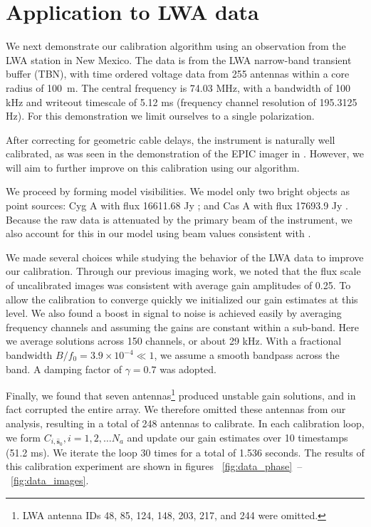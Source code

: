 \documentclass[a4paper,fleqn,usenatbib]{mnras}
\begin{document}
\section{Application to LWA data}\label{sec:data}
We next demonstrate our calibration algorithm using an observation from the LWA station in 
New Mexico. The data is from the LWA narrow-band transient buffer (TBN), with time ordered 
voltage data from 255 antennas within a core radius of 100~m. The central frequency is 74.03 
MHz, with a bandwidth of 100 kHz and writeout timescale of 5.12 ms (frequency channel 
resolution of 195.3125 Hz). For this demonstration we limit ourselves to a single polarization.

After correcting for geometric cable delays, the instrument is naturally well calibrated, as was 
seen in the demonstration of the EPIC imager in \citealt{thy15c}. However, we will aim to 
further improve on this calibration using our algorithm.

We proceed by forming model visibilities. We model only two bright objects as point sources: 
Cyg A with flux 16611.68 Jy \citep{coh07}; and Cas A with flux 17693.9 Jy \citep{kas07}. 
Because the raw data is attenuated by the primary beam of the instrument, we also account for 
this in our model using beam values consistent with \cite{hic12}.

We made several choices while studying the behavior of the LWA data to improve our 
calibration. Through our previous imaging work, we noted that the flux scale of uncalibrated 
images was consistent with average gain amplitudes of 0.25. To allow the calibration to 
converge quickly we initialized our gain estimates at this level. We also found a boost in signal 
to noise is achieved easily by averaging frequency channels and assuming the gains are 
constant within a sub-band. Here we average solutions across 150 channels, or about 29 kHz. 
With a fractional bandwidth $B/f_0 = 3.9 \times 10^{-4} \ll 1$, we assume a smooth bandpass 
across the band. 
A damping factor of $\gamma = 0.7$ was adopted.

Finally, we found that seven antennas\footnote{LWA antenna IDs 48, 85, 124, 148, 203, 217, 
and 244 were omitted.} produced unstable gain solutions, and in fact corrupted the entire array. 
We therefore omitted these antennas from our analysis, resulting in a total of 248 antennas to 
calibrate. In each calibration loop, we form $C_{i,\hat{\boldsymbol{s}}_0}, i=1,2,\ldots N_a$ and 
update our gain estimates over 10 timestamps (51.2 ms). We iterate the loop 30 times for a 
total of 1.536 seconds. The results of this calibration experiment are shown in figures~
\ref{fig:data_phase}~--~\ref{fig:data_images}.
\end{document}
